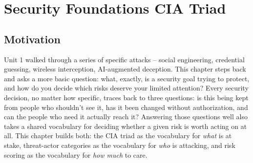 \chapter{Security Foundations CIA Triad}
\label{ch:2.1}


\section{Motivation}

Unit 1 walked through a series of specific attacks -- social engineering, credential guessing,
wireless interception, AI-augmented deception. This chapter steps back and asks a more basic
question: what, exactly, is a security goal trying to protect, and how do you decide which risks
deserve your limited attention? Every security decision, no matter how specific, traces back to
three questions: is this being kept from people who shouldn't see it, has it been changed
without authorization, and can the people who need it actually reach it? Answering those
questions well also takes a shared vocabulary for deciding whether a given risk is worth acting on
at all. This chapter builds both:
the CIA triad as the vocabulary for \emph{what} is at stake, threat-actor categories as the
vocabulary for \emph{who} is attacking, and risk scoring as the vocabulary for \emph{how much} to
care.

